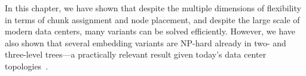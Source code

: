 In this chapter, we have shown that despite the
multiple dimensions of flexibility in terms of chunk assignment and node placement, 
and despite the large scale of modern data centers, 
many variants can be solved efficiently. However, we have also
shown that several embedding variants are NP-hard already in two-
and three-level trees---a practically relevant result given today's data center topologies~\cite{fattree}.




